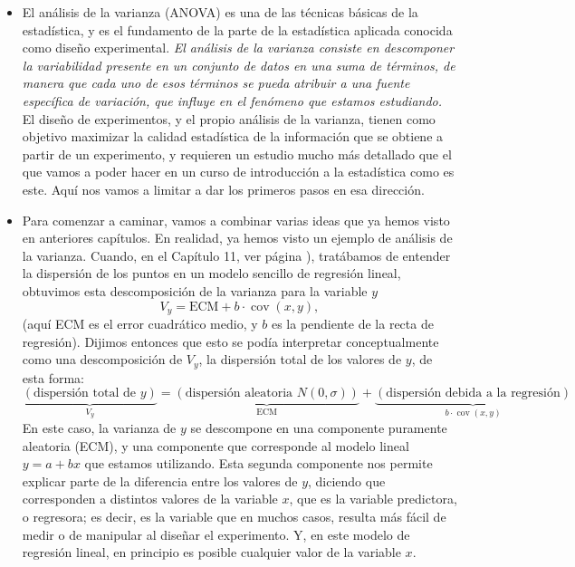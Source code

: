 \begin{itemize}

    \item El análisis de la varianza (ANOVA) es una de las técnicas básicas de la estadística, y es el fundamento de la parte de la estadística aplicada conocida como diseño experimental.  {\em El análisis de la varianza consiste en descomponer la variabilidad presente en un conjunto de datos en una suma de términos, de manera que cada uno de esos términos se pueda atribuir a una fuente específica de variación, que influye en el fenómeno que estamos estudiando.} El diseño de experimentos, y el propio análisis de la varianza, tienen como objetivo maximizar la calidad estadística de la información que se obtiene a partir de un experimento, y requieren un estudio mucho más detallado que el que vamos a poder hacer en un curso de introducción a la estadística como es este. Aquí nos vamos a limitar a dar los primeros pasos en esa dirección.

    \item Para comenzar a caminar, vamos a combinar varias ideas que ya hemos visto en anteriores capítulos. En realidad, ya hemos visto un ejemplo de análisis de la varianza. Cuando, en el Capítulo 11, ver página \pageref{sec:anova}), tratábamos de entender la dispersión de los puntos en un modelo sencillo de regresión lineal, obtuvimos esta descomposición de la varianza para la variable $y$
        \[V_y=\mbox{ECM}+b\cdot\operatorname{cov}(x,y),\]
        (aquí ECM es el error cuadrático medio, y $b$ es la pendiente de la recta de regresión). Dijimos entonces que esto se podía interpretar conceptualmente como una descomposición de $V_y$, la dispersión total de los valores de $y$, de esta forma:
        \[
        \underbrace{\left(\mbox{dispersión total de }y\right)}_{V_y}=
        \underbrace{\left(\mbox{dispersión aleatoria }N(0,\sigma)\right)}_{\mbox{ECM}}+
        \underbrace{\left(\mbox{dispersión debida a la regresión}\right)}_{b\cdot\operatorname{cov}(x,y)}
        \]
        En este caso, la varianza de $y$ se descompone en una componente puramente aleatoria (ECM), y una componente que corresponde al modelo lineal $y=a+bx$ que estamos utilizando. Esta segunda componente nos permite explicar parte de la diferencia entre los valores de $y$, diciendo que corresponden a distintos valores de la variable $x$, que es la variable predictora, o regresora; es decir, es la variable que en muchos casos, resulta más fácil de medir o de manipular al diseñar el experimento. Y, en este modelo de regresión lineal, en principio es posible cualquier valor de la variable $x$.


\end{itemize}
